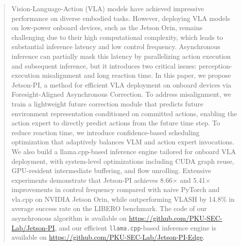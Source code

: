 
\begin{abstract}
    Vision-Language-Action (VLA) models have achieved impressive performance on diverse embodied tasks. However, deploying VLA models on low-power onboard devices, such as the Jetson Orin, remains challenging due to their high computational complexity, which leads to substantial inference latency and low control frequency. Asynchronous inference can partially mask this latency by parallelizing action execution and subsequent inference, but it introduces two critical issues: perception-execution misalignment and long reaction time. In this paper, we propose Jetson-PI, a method for efficient VLA deployment on onboard devices via Foresight-Aligned Asynchronous Correction. To address misalignment, we train a lightweight future correction module that predicts future environment representation conditioned on committed actions, enabling the action expert to directly predict actions from the future time step. To reduce reaction time, we introduce confidence-based scheduling optimization that adaptively balances VLM and action expert invocations.
    We also build a llama.cpp-based inference engine tailored for onboard VLA deployment, with system-level optimizations including CUDA graph reuse, GPU-resident intermediate buffering, and flow unrolling.
    Extensive experiments demonstrate that Jetson-PI achieves 8.66$\times$ and 5.41$\times$ improvements in control frequency compared with naive PyTorch and vla.cpp on NVIDIA Jetson Orin, while outperforming VLASH by 14.8\% in average success rate on the LIBERO benchmark.
    The code of our asynchronous algorithm is available on \url{https://github.com/PKU-SEC-Lab/Jetson-PI}, and our efficient \texttt{llama.cpp}-based inference engine is available on \url{https://github.com/PKU-SEC-Lab/Jetson-PI-Edge}.
\end{abstract}



